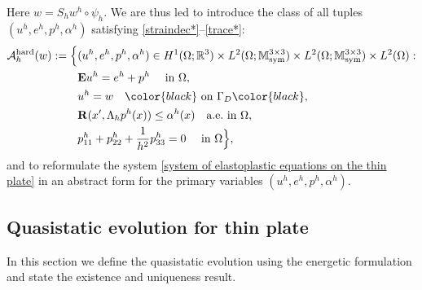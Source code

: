 \documentclass[reqno,10pt]{amsart}
\numberwithin{equation}{section}
\theoremstyle{remark}
\newcommand{\RED}{\color{black}}
\newcommand{\BLACK}{\color{black}}
\newcommand{\PINK}{\color{black}}
\newcommand{\calA}{\mathcal{A}}
\newcommand{\M}{\mathbb{M}}
\newcommand{\R}{\mathbb{R}}
\DeclareMathOperator{\sym}{sym}
\newcommand{\Dir}{D}
\newcommand{\scaling}{{S}}
\newcommand{\E}{{\bf E}}
\newcommand{\disspot}{\mathbf{R}}
\begin{document}
Here $w = \scaling_h w^h \circ \psi_h$.
{\RED 
We are thus led to introduce the class of all tuples $(u^h, e^h, p^h, \alpha^h)$ satisfying \eqref{straindec*}--\eqref{trace*}:
\begin{align*}
	\calA_{h}^{\rm hard}(w) := \Big\{ 
	& (u^h, e^h, p^h, \alpha^h) \in H^1(\Omega;\R^3) \times L^2(\Omega;\M^{3 \times 3}_{\sym}) \times L^2(\Omega;\M^{3 \times 3}_{\sym}) \times L^2(\Omega) :
	\\& {\E}u^h = e^h + p^h \quad \text{ in } \Omega,
	\\& u^h = w \quad {\PINK\text{ on } \Gamma_\Dir\BLACK},
	\\& \disspot(x', \Lambda_h p^h(x)) \leq \alpha^h(x) \quad \text{a.e.} \text{ in } \Omega, 
	\\& p^h_{11} + p^h_{22} + \frac{1}{h^2}p^h_{33} = 0 \quad \text{ in } \Omega 
	\Big\},
\end{align*}
and to reformulate the system \eqref{system of elastoplastic equations on the thin plate} in an abstract form for the primary variables $(u^h, e^h, p^h, \alpha^h)$.
\BLACK}

\subsection{Quasistatic evolution for thin plate}\label{section quasistatic evolution} 

In this section we define the quasistatic evolution using the energetic formulation and state the existence and uniqueness result.
\end{document}
